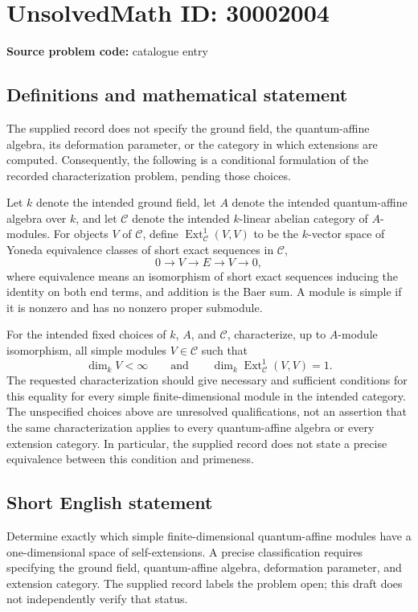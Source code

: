 \documentclass[11pt]{article}
\begin{document}
\section*{UnsolvedMath ID: 30002004}
\textbf{Source problem code:} catalogue entry
\subsection{Definitions and mathematical statement}
The supplied record does not specify the ground field, the quantum-affine algebra, its deformation parameter, or the category in which extensions are computed. Consequently, the following is a conditional formulation of the recorded characterization problem, pending those choices.

Let \(k\) denote the intended ground field, let \(A\) denote the intended quantum-affine algebra over \(k\), and let \(\mathcal C\) denote the intended \(k\)-linear abelian category of \(A\)-modules. For objects \(V\) of \(\mathcal C\), define \(\operatorname{Ext}^{1}_{\mathcal C}(V,V)\) to be the \(k\)-vector space of Yoneda equivalence classes of short exact sequences in \(\mathcal C\),
\[
0\longrightarrow V\longrightarrow E\longrightarrow V\longrightarrow 0,
\]
where equivalence means an isomorphism of short exact sequences inducing the identity on both end terms, and addition is the Baer sum. A module is simple if it is nonzero and has no nonzero proper submodule.

For the intended fixed choices of \(k\), \(A\), and \(\mathcal C\), characterize, up to \(A\)-module isomorphism, all simple modules \(V\in\mathcal C\) such that
\[
\dim_k V<\infty
\qquad\text{and}\qquad
\dim_k\operatorname{Ext}^{1}_{\mathcal C}(V,V)=1.
\]
The requested characterization should give necessary and sufficient conditions for this equality for every simple finite-dimensional module in the intended category. The unspecified choices above are unresolved qualifications, not an assertion that the same characterization applies to every quantum-affine algebra or every extension category. In particular, the supplied record does not state a precise equivalence between this condition and primeness.
\subsection{Short English statement}
Determine exactly which simple finite-dimensional quantum-affine modules have a one-dimensional space of self-extensions. A precise classification requires specifying the ground field, quantum-affine algebra, deformation parameter, and extension category. The supplied record labels the problem open; this draft does not independently verify that status.
\end{document}

